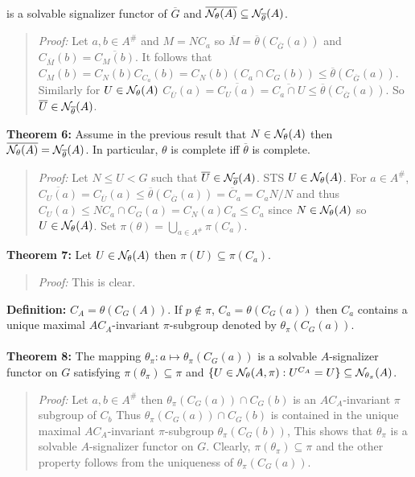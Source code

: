 is a solvable signalizer functor  of ${\overline G}$ and 
${\overline {{\cal N}_{\theta}(A)}} \subseteq {\cal N}_{\overline {\theta}} (A)$.
\begin{quote}
\emph{Proof:}  
Let $a, b \in A^{\#}$ and $M= N C_a$ so
$ {\overline M} = 
{\overline {\theta}}(C_{\overline G}(a)) $
and $ C_{\overline M}(b) = {\overline {C_M(b)}}$.  It follows that
$C_M(b)= C_N(b) C_{C_a}(b)= C_N(b) (C_a \cap C_{G}(b)) \le 
{\overline {\theta}}(C_{\overline G}(a)) $.
Similarly for $U \in {\cal N}_{\theta}(A)$ 
$C_{\overline U}(a)= {\overline {C_U(a)}}= {\overline {C_a \cap U}}
\le {\overline {\theta}}(C_{\overline G}(a)) $.
So ${\overline U} \in {\cal N}_{\overline {\theta}}(A)$.
\end{quote}
{\bf Theorem 6:}
Assume in the previous result that $N \in
{\cal N}_{\theta}(A)$  then $
{\overline {{\cal N}_{\theta}(A)}} = 
{\cal N}_{\overline {\theta}}(A)$.  In particular, $\theta$ is complete iff ${\overline {\theta}}$
is complete.
\begin{quote}
\emph{Proof:}  
Let $N \le U < G$ such that 
${\overline U} \in {\cal N}_{\overline {\theta}}(A)$.  STS
$U \in {\cal N}_{\theta}(A)$.  For $a \in A^{\#}$,
$ {\overline {C_U(a)}} = C_{\overline U}(a)
\le {\overline {\theta}}(C_{\overline G}(a))= {\overline C}_a= C_a N/N$ and thus
$C_U(a) \le N C_a \cap C_G(a) = C_N(a) C_a \le C_a$  since $N \in
{\cal N}_{\theta}(A) $ so
$U \in {\cal N}_{\theta}(A)$.  Set $\pi(\theta) = \bigcup_{a \in A^{\#}} \pi(C_a)$.
\end{quote}
{\bf Theorem 7:} Let $U \in 
{\cal N}_{\theta}(A)$ then $\pi(U) \subseteq \pi(C_a)$.
\begin{quote}
\emph{Proof:}  
This is clear.
\end{quote}
{\bf Definition:} 
$C_A = \theta(C_G(A))$.
If $p \notin \pi$, $C_a= \theta(C_G(a))$ then $C_a$ contains a unique 
maximal $AC_A$-invariant $\pi$-subgroup denoted by $\theta_{\pi}(C_G(a))$.
\\
\\
{\bf Theorem 8:}
The mapping
$\theta_{\pi}: a \mapsto
\theta_{\pi}(C_G(a))$ is a solvable $A$-signalizer functor on $G$ satisfying
$\pi(\theta_{\pi}) \subseteq \pi$ and
$\{ U \in
{\cal N}_{\theta}(A, \pi): U^{C_A} = U \} \subseteq
{\cal N}_{\theta_{\pi}}(A)$.
\begin{quote}
\emph{Proof:}  
Let $a, b \in A^{\#}$ then 
$\theta_{\pi}(C_G(a)) \cap C_G(b)$ is an $A C_A$-invariant
$\pi$ subgroup of $C_b$  Thus
$\theta_{\pi}(C_G(a)) \cap C_G(b)$ is contained in the unique maximal 
$A C_A$-invariant $\pi$-subgroup 
$\theta_{\pi}(C_G(b))$,  This shows that $\theta_{\pi}$ is a solvable
$A$-signalizer functor on $G$.
Clearly, $\pi(\theta_{\pi}) \subseteq  \pi$ and the other property 
follows from the uniqueness of $\theta_{\pi}(C_G(a))$.
\end{quote}
